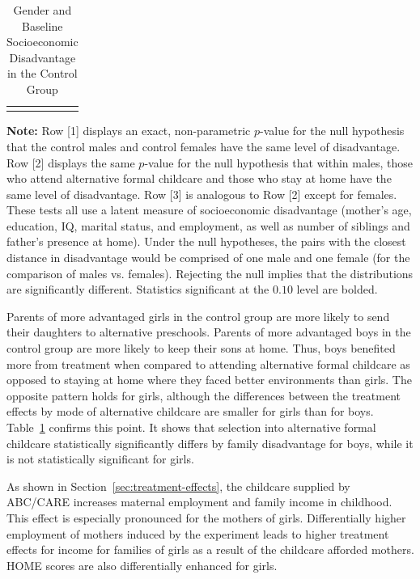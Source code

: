 \begin{table}[!htpb]
\begin{threeparttable}
\caption{Gender and Baseline Socioeconomic Disadvantage in the Control Group} \label{table:disadtests}
\centering
\begin{tabularx}{16.5cm}{XcX}
&  &
\end{tabularx}
\begin{tablenotes}
\footnotesize
\item \textbf{Note:} Row [1] displays an exact, non-parametric $p$-value for the null hypothesis that the control males and control females have the same level of disadvantage. Row [2] displays the same $p$-value for the null  hypothesis that within males, those who attend alternative formal childcare and those who stay at home have the same level of disadvantage. Row [3] is analogous to Row [2] except for females. These tests all use a latent measure of socioeconomic disadvantage (mother's age, education, IQ, marital status, and employment, as well as number of siblings and father's presence at home). Under the null hypotheses, the pairs with the closest distance in disadvantage would be comprised of one male and one female (for the comparison of males vs. females). Rejecting the null implies that the distributions are significantly different. Statistics significant at the $0.10$ level are bolded.
\end{tablenotes}
\end{threeparttable}
\end{table}

Parents of more advantaged girls in the control group are more likely to send their daughters to alternative preschools. Parents of more advantaged boys in the control group are more likely to keep their sons at home. Thus, boys benefited more from treatment when compared to attending alternative formal childcare as opposed to staying at home where they faced better environments than girls. The opposite pattern holds for girls, although the differences between the treatment effects by mode of alternative childcare are smaller for girls than for boys. Table~\ref{table:disadtests} confirms this point. It shows that selection into alternative formal childcare statistically significantly differs by family disadvantage for boys, while it is not statistically significant for girls.

As shown in Section~\ref{sec:treatment-effects}, the childcare supplied by ABC/CARE increases maternal employment and family income in childhood. This effect is especially pronounced for the mothers of girls. Differentially higher employment of mothers induced by the experiment leads to higher treatment effects for income for families of girls as a result of the childcare afforded mothers. HOME scores are also differentially enhanced for girls.


